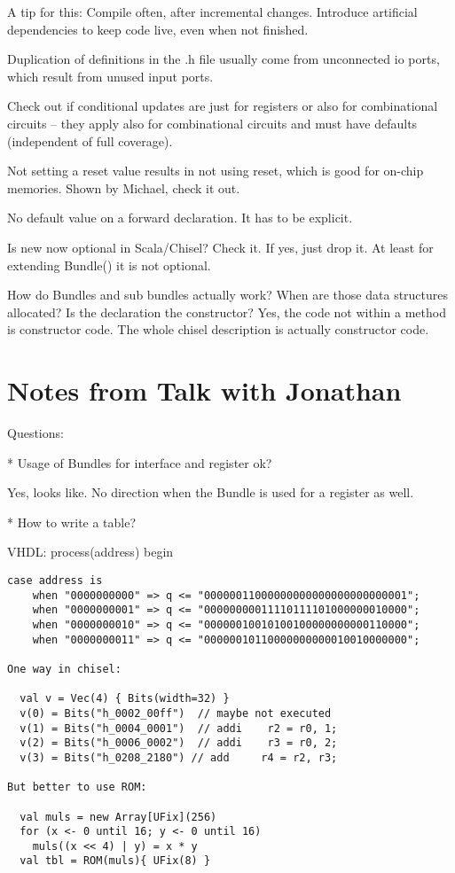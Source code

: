 \documentclass[a4paper, conference]{IEEEtran}
\begin{document}
A tip for this: Compile often, after incremental changes. Introduce artificial
dependencies to keep code live, even when not finished.

Duplication of definitions in the .h file usually come from unconnected
io ports, which result from unused input ports.

Check out if conditional updates are just for registers or also for combinational circuits
-- they apply also for combinational circuits and must have defaults (independent of
full coverage).

Not setting a reset value results in not using reset, which is good for on-chip memories. Shown by Michael, check it out.

No default value on a forward declaration. It has to be explicit.

Is new now optional in Scala/Chisel? Check it. If yes, just drop it. At least for extending Bundle()
it is not optional.

How do Bundles and sub bundles actually work? When are those data structures allocated?
Is the declaration the constructor? Yes, the code not within a method is constructor code.
The whole chisel description is actually constructor code.

\section{Notes from Talk with Jonathan}

Questions:

* Usage of Bundles for interface and register ok?

Yes, looks like. No direction when the Bundle is used for a register as well.

* How to write a table?

VHDL:
process(address) begin

\begin{verbatim}
case address is
    when "0000000000" => q <= "00000011000000000000000000000001";
    when "0000000001" => q <= "00000000011110111101000000010000";
    when "0000000010" => q <= "00000010010100100000000000110000";
    when "0000000011" => q <= "00000010110000000000010010000000";

One way in chisel:

  val v = Vec(4) { Bits(width=32) }
  v(0) = Bits("h_0002_00ff")  // maybe not executed
  v(1) = Bits("h_0004_0001")  // addi    r2 = r0, 1;
  v(2) = Bits("h_0006_0002")  // addi    r3 = r0, 2;
  v(3) = Bits("h_0208_2180") // add     r4 = r2, r3;

But better to use ROM:

  val muls = new Array[UFix](256)
  for (x <- 0 until 16; y <- 0 until 16)
    muls((x << 4) | y) = x * y
  val tbl = ROM(muls){ UFix(8) }

\end{verbatim}
\end{document}
